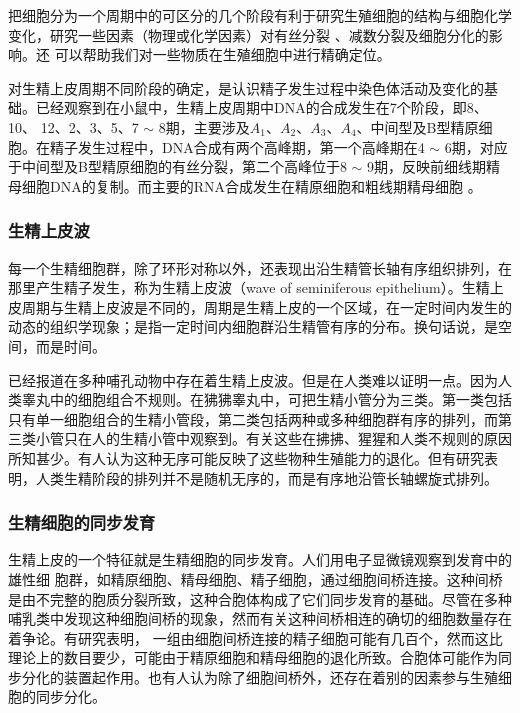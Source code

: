 把细胞分为一个周期中的可区分的几个阶段有利于研究生殖细胞的结构与细胞化学 变化，研究一些因素（物理或化学因素）对有丝分裂 、减数分裂及细胞分化的影响。还 可以帮助我们对一些物质在生殖细胞中进行精确定位。

对生精上皮周期不同阶段的确定，是认识精子发生过程中染色体活动及变化的基础。已经观察到在小鼠中，生精上皮周期中DNA的合成发生在7个阶段，即8、10、 12、2、3、5、7 $ \sim $ 8期，主要涉及$ A_1 $、$ A_2 $、$ A_3 $、$ A_4 $、中间型及B型精原细胞。在精子发生过程中，DNA合成有两个高峰期，第一个高峰期在4 $ \sim $ 6期，对应于中间型及B型精原细胞的有丝分裂，第二个高峰位于8 $ \sim $  9期，反映前细线期精母细胞DNA的复制。而主要的RNA合成发生在精原细胞和粗线期精母细胞 。

\subsubsection{生精上皮波}

每一个生精细胞群，除了环形对称以外，还表现出沿生精管长轴有序组织排列，在那里产生精子发生，称为生精上皮波（wave of seminiferous epithelium）。生精上皮周期与生精上皮波是不同的，周期是生精上皮的一个区域，在一定时间内发生的动态的组织学现象；是指一定时间内细胞群沿生精管有序的分布。换句话说，是空间，而是时间。

已经报道在多种哺孔动物中存在着生精上皮波。但是在人类难以证明一点。因为人类睾丸中的细胞组合不规则。在狒狒睾丸中，可把生精小管分为三类。第一类包括只有单一细胞组合的生精小管段，第二类包括两种或多种细胞群有序的排列，而第三类小管只在人的生精小管中观察到。有关这些在拂拂、猩猩和人类不规则的原因所知甚少。有人认为这种无序可能反映了这些物种生殖能力的退化。但有研究表明，人类生精阶段的排列并不是随机无序的，而是有序地沿管长轴螺旋式排列。

\subsubsection{生精细胞的同步发育}

生精上皮的一个特征就是生精细胞的同步发育。人们用电子显微镜观察到发育中的雄性细 胞群，如精原细胞、精母细胞、精子细胞，通过细胞间桥连接。这种间桥是由不完整的胞质分裂所致，这种合胞体构成了它们同步发育的基础。尽管在多种哺乳类中发现这种细胞间桥的现象，然而有关这种间桥相连的确切的细胞数量存在着争论。有研究表明， 一组由细胞间桥连接的精子细胞可能有几百个，然而这比理论上的数目要少，可能由于精原细胞和精母细胞的退化所致。合胞体可能作为同步分化的装置起作用。也有人认为除了细胞间桥外，还存在着别的因素参与生殖细胞的同步分化。

